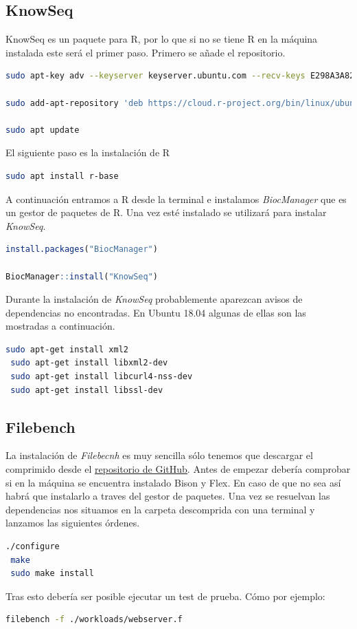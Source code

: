 \subsection{KnowSeq}
KnowSeq es un paquete para R, por lo que si no se tiene R en la máquina instalada este será el primer paso. Primero se añade el repositorio.
\begin{lstlisting}[language=bash]
sudo apt-key adv --keyserver keyserver.ubuntu.com --recv-keys E298A3A825C0D65DFD57CBB651716619E084DAB9

sudo add-apt-repository 'deb https://cloud.r-project.org/bin/linux/ubuntu bionic-cran40/'

sudo apt update
\end{lstlisting}
El siguiente paso es la instalación de R
\begin{lstlisting}[language=bash]
sudo apt install r-base
\end{lstlisting}
A continuación entramos a R desde la terminal e instalamos \textit{BiocManager} que es un gestor de paquetes de R. Una vez esté instalado se utilizará para instalar \textit{KnowSeq}.
\begin{lstlisting}[language=R]
install.packages("BiocManager")

BiocManager::install("KnowSeq")
\end{lstlisting}
Durante la instalación de \textit{KnowSeq} probablemente aparezcan avisos de dependencias no encontradas. En Ubuntu 18.04 algunas de ellas son las mostradas a continuación.

\begin{lstlisting}[language=bash]
 sudo apt-get install xml2
 sudo apt-get install libxml2-dev
 sudo apt-get install libcurl4-nss-dev
 sudo apt-get install libssl-dev

\end{lstlisting}
\subsection{Filebench}
La instalación de \textit{Filebecnh} es muy sencilla sólo tenemos que descargar el comprimido desde el \href{https://github.com/filebench/filebench/releases}{repositorio de \underline{GitHub}}. Antes de empezar debería comprobar si en la máquina se encuentra instalado Bison y Flex. En caso de que no sea así habrá que instalarlo a traves del gestor de paquetes. Una vez se resuelvan las dependencias nos situamos en la carpeta descomprida con una terminal y lanzamos las siguientes órdenes. 

\begin{lstlisting}[language=bash]
 ./configure
 make
 sudo make install
\end{lstlisting}

Tras esto debería ser posible ejecutar un test de prueba. Cómo por ejemplo:
\begin{lstlisting}[language=bash]
 filebench -f ./workloads/webserver.f
\end{lstlisting}